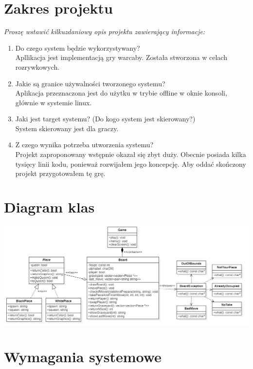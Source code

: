 \documentclass{article}
\begin{document}
\makeheader

\section{Zakres projektu}
 {\small\it Proszę wstawić kilkuzdaniowy opis projektu zawierający informacje:
  \begin{enumerate}
    \item Do czego system będzie wykorzystywany?
          \\
          \textup{Apllikacja jest implementacją gry warcaby. Została stworzona w celach rozrywkowych.}
    \item Jakie są granice używalności tworzonego systemu?
          \\
          \textup{Aplikacja przeznaczona jest do użytku w trybie offline w oknie konsoli, głównie w systemie linux.}
    \item Jaki jest target systemu? (Do kogo system jest skierowany?)
          \\
          \textup{System skierowany jest dla graczy.}
    \item Z czego wynika potrzeba utworzenia systemu?
          \\
          \textup{Projekt zaproponowany wstępnie okazał się zbyt duży. Obecnie posiada kilka tysięcy linii kodu, ponieważ rozwijałem jego koncepcję. Aby oddać skończony projekt przygotowałem tę grę.}
  \end{enumerate}}
\section{Diagram klas}

\includegraphics[width=\textwidth]{PO_Cpp.png}

\section{Wymagania systemowe}
\end{document}
